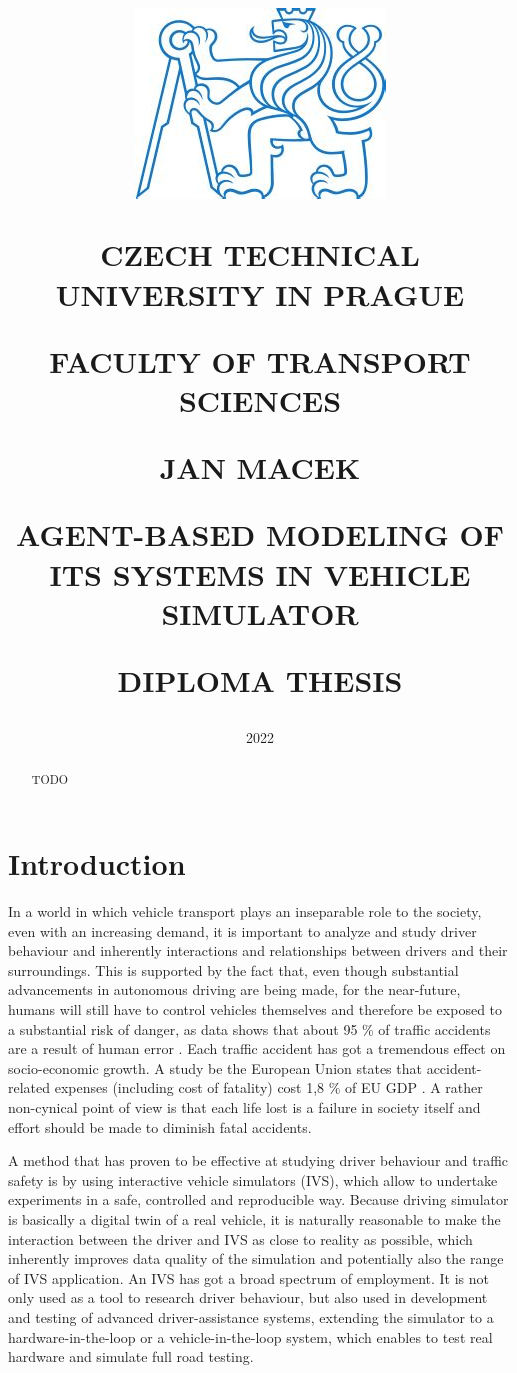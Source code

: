 \documentclass[titlepage, 12pt, draft]{article}
\title{
\includegraphics[width=.3\textwidth]{cvut-logo.jpg}\par
\vspace{10mm}
\indent
\textbf{CZECH TECHNICAL UNIVERSITY IN PRAGUE}

FACULTY OF TRANSPORT SCIENCES

\vfill

{\Large JAN MACEK}
\vspace{10mm}

AGENT-BASED MODELING OF ITS SYSTEMS IN VEHICLE SIMULATOR 
\vspace{15mm}

{\Large DIPLOMA THESIS}
\vfill

}
\date{\Large 2022}
\begin{document}
\setlength{\baselineskip}{1.5em}
\maketitle



\begin{abstract}
    TODO
\end{abstract}

\tableofcontents
\newpage

\section{Introduction}

In a world in which vehicle transport plays an inseparable role to the society, even with an increasing
demand, it is important to analyze and study driver behaviour and inherently interactions and
relationships between drivers and their surroundings. This is supported by the fact that, even though
substantial advancements in autonomous driving are being made, for the near-future, humans will still
have to control vehicles themselves and therefore be exposed to a substantial risk of danger, as
data shows that about 95 \% of traffic accidents are a result of human error \cite{Parliament2021}. 
Each traffic accident has got a tremendous effect on socio-economic growth. A study be the European
Union states that accident-related expenses (including cost of fatality) cost 1,8 \% of EU GDP \cite{Wijnen2017}.  
A rather non-cynical point of view is that each life lost is a failure in society itself and effort
should be made to diminish fatal accidents.

A method that has proven to be effective at studying driver behaviour and
traffic safety is by using interactive vehicle simulators (IVS), which allow to
undertake experiments in a safe, controlled and reproducible way.  Because
driving simulator is basically a digital twin of a real vehicle, it is naturally
reasonable to make the interaction between the driver and IVS as close to
reality as possible, which inherently improves data quality of the simulation
and potentially also the range of IVS application. An IVS has got a broad
spectrum of employment. It is not only used as a tool to research driver
behaviour, but also used in development and testing of advanced
driver-assistance systems, extending the simulator to a hardware-in-the-loop or
a vehicle-in-the-loop system, which enables to test real hardware and simulate
full road testing.
\end{document}
